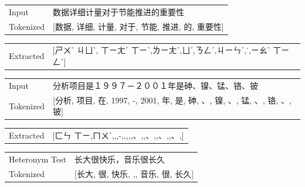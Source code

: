 \vspace{0.2cm}

    \begin{table}[h]
        \centering

        \begin{CJK*}{UTF8}{gbsn}
            \begin{tabular}{p{2.3cm}p{12cm}}\toprule
                Input & 数据详细计量对于节能推进的重要性 \\
                Tokenized & [数据, 详细, 计量, 对于, 节能, 推进, 的, 重要性] \\
            \end{tabular}
        \end{CJK*}
        
        \begin{CJK}{UTF8}{bsmi}
        \begin{tabular}{p{2.3cm}p{12cm}}
            Extracted & [ㄕㄨˋ ㄐㄩˋ,\enspace
            ㄒㄧㄤˊ ㄒㄧˋ, ㄌㄧㄤˋ, ㄩˊ, ㄋㄥˊ, ㄐㄧㄣˋ,˙, ㄧㄠˋ ㄒㄧㄥˋ]
        \end{tabular}
        \end{CJK}

        \begin{CJK*}{UTF8}{gbsn}
            \begin{tabular}{p{2.3cm}p{12cm}}\toprule
                Input & 分析项目是１９９７－２００１年是砷、镍、锰、铬、铍 \\
                Tokenized & [分析, 项目, 在, 1997, -, 2001, 年, 是, 砷, 、, 镍, 、, 锰, 、, 铬, 、, 铍] \\
            \end{tabular}
        \end{CJK*}
        
        \begin{CJK}{UTF8}{bsmi}
        \begin{tabular}{p{2.3cm}p{12cm}}
            Extracted & [ㄈㄣ ㄒㄧ, ㄇㄨˋ,,\enspace1997,\enspace-,\enspace2001,,,,\enspace、,,\enspace、,,\enspace、,,\enspace、,]
        \end{tabular}
        \end{CJK}

        \begin{CJK*}{UTF8}{gbsn}
            \begin{tabular}{p{2.3cm}p{12cm}}\toprule
                Heteronym Test & 长大很快乐，音乐很长久 \\
                Tokenized & [长大, 很, 快乐, ,, 音乐, 很, 长久] \\
            \end{tabular}
        \end{CJK*}
        

\end{table}
